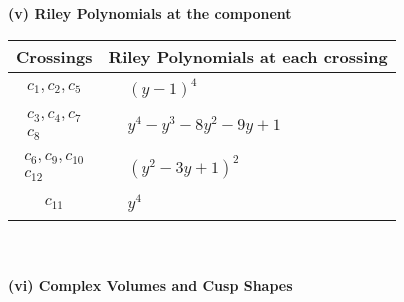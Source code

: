 \documentclass[1p]{elsarticle_modified}
\theoremstyle{definition}
\begin{document}
\newpage\renewcommand{\arraystretch}{1}
\flushleft \textbf{(v) Riley Polynomials at the component}\newline \\
\begin{tabular}{m{50pt}|m{274pt}}
Crossings & \hspace{64pt}Riley Polynomials at each crossing \\
\hline $$\begin{aligned}c_{1},c_{2},c_{5}\end{aligned}$$&$\begin{aligned}
&(y-1)^4
\end{aligned}$\\
\hline $$\begin{aligned}c_{3},c_{4},c_{7}\\c_{8}\end{aligned}$$&$\begin{aligned}
&y^4- y^3-8 y^2-9 y+1
\end{aligned}$\\
\hline $$\begin{aligned}c_{6},c_{9},c_{10}\\c_{12}\end{aligned}$$&$\begin{aligned}
&(y^2-3 y+1)^2
\end{aligned}$\\
\hline $$\begin{aligned}c_{11}\end{aligned}$$&$\begin{aligned}
&y^4
\end{aligned}$\\
\hline
\end{tabular}\\~\\
\newpage\flushleft \textbf{(vi) Complex Volumes and Cusp Shapes}
\end{document}
